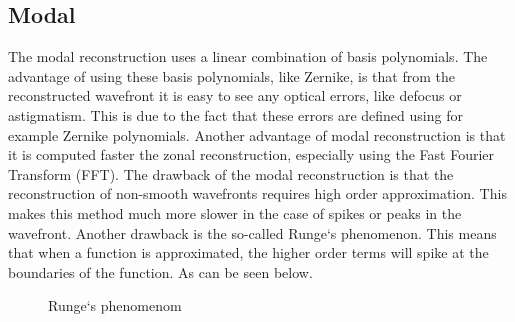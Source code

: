 \documentclass{article}
\begin{document}
\subsection{Modal}
The modal reconstruction uses a linear combination of basis polynomials. The advantage of using these basis polynomials, like Zernike, is that from the reconstructed wavefront it is easy to see any optical errors, like defocus or astigmatism. This is due to the fact that these errors are defined using for example Zernike polynomials. Another advantage of modal reconstruction is that it is computed faster the zonal reconstruction, especially using the Fast Fourier Transform (FFT).
\newline
\newline
The drawback of the modal reconstruction is that the reconstruction of non-smooth wavefronts requires high order approximation. This makes this method much more slower in the case of spikes or peaks in the wavefront. Another drawback is the so-called Runge`s phenomenon. This means that when a function is approximated, the higher order terms will spike at the boundaries of the function. As can be seen below.
\begin{figure}[h!]
  \centering
  \caption{Runge`s phenomenom}
\end{figure} 

% 
% 
\end{document}
